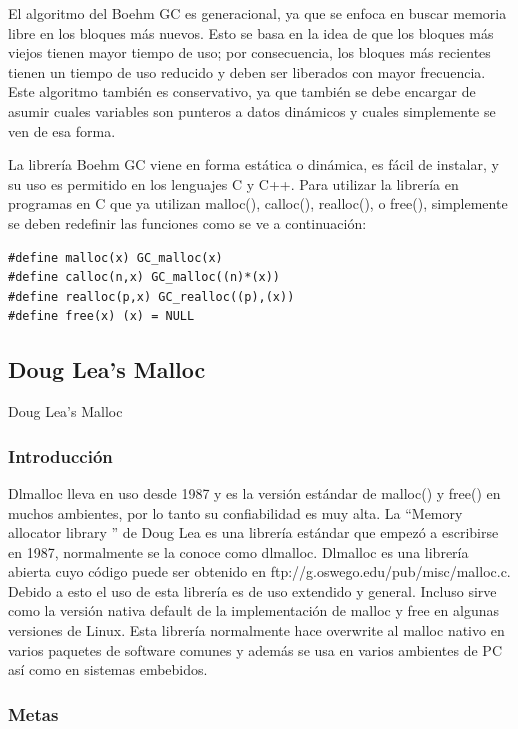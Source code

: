 \documentclass[11pt]{article} %
\begin{document}
	El algoritmo del Boehm GC es generacional, ya que se enfoca en buscar memoria libre en los bloques más nuevos. Esto se basa en la idea de que los bloques más viejos tienen mayor tiempo de uso; por consecuencia, los bloques más recientes tienen un tiempo de uso reducido y deben ser liberados con mayor frecuencia. Este algoritmo también es conservativo, ya que también se debe encargar de asumir cuales variables son punteros a datos dinámicos y cuales simplemente se ven de esa forma.

	La librería Boehm GC viene en forma estática o dinámica, es fácil de instalar, y su uso es permitido en los lenguajes C y C++. Para utilizar la librería en programas en C que ya utilizan malloc(), calloc(), realloc(), o free(), simplemente se deben redefinir las funciones como se ve a continuación:
\lstset{language=C}          %

\begin{lstlisting}[frame=single]  % Start your code-block
#define malloc(x) GC_malloc(x)
#define calloc(n,x) GC_malloc((n)*(x))
#define realloc(p,x) GC_realloc((p),(x))
#define free(x) (x) = NULL
\end{lstlisting}

\subsection{Doug Lea's Malloc}
 Doug Lea's Malloc
\subsubsection{Introducción}
Dlmalloc lleva en uso desde 1987 y es la versión estándar de malloc() y free() en muchos ambientes, por lo tanto su confiabilidad es muy alta.
La “Memory allocator library  ” de Doug Lea es una librería estándar que empezó a escribirse en 1987, normalmente se la conoce como dlmalloc.
Dlmalloc es una librería abierta cuyo código puede ser obtenido en ftp://g.oswego.edu/pub/misc/malloc.c. 
Debido a esto el uso de esta librería es de uso extendido y general. Incluso sirve como la versión nativa default de la implementación de malloc y free en algunas versiones de Linux. Esta librería normalmente hace overwrite al malloc nativo en varios paquetes de software comunes y además se usa en varios ambientes de PC así como en sistemas embebidos. 
\subsubsection{Metas}
\end{document}
